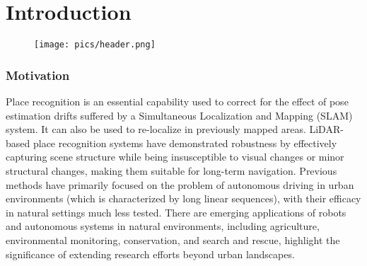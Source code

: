\chapter{Introduction}
\label{chap:intro}

\begin{figure}
    \texttt{[image: pics/header.png]}
    \label{fig:motivation}
\end{figure}

\subsection*{Motivation}
Place recognition is an essential capability used to correct for the effect of pose estimation drifts suffered by a Simultaneous Localization and Mapping (SLAM) system. It can also be used to re-localize in previously mapped areas. 
LiDAR-based place recognition systems have demonstrated robustness by effectively capturing scene structure while being insusceptible to visual changes or minor structural changes, making them suitable for long-term navigation. 
Previous methods have primarily focused on the problem of autonomous driving in urban environments (which is characterized by long linear sequences), with their efficacy in natural settings much less tested.
There are emerging applications of robots and autonomous systems in natural environments, including agriculture, environmental monitoring, conservation, and search and rescue, highlight the significance of extending research efforts beyond urban landscapes.

